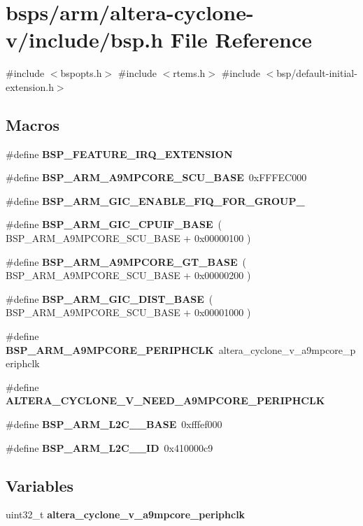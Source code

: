\hypertarget{bsps_2arm_2altera-cyclone-v_2include_2bsp_8h}{}\section{bsps/arm/altera-\/cyclone-\/v/include/bsp.h File Reference}
\label{bsps_2arm_2altera-cyclone-v_2include_2bsp_8h}
{\ttfamily \#include $<$bspopts.\+h$>$}\newline
{\ttfamily \#include $<$rtems.\+h$>$}\newline
{\ttfamily \#include $<$bsp/default-\/initial-\/extension.\+h$>$}\newline
\subsection*{Macros}
\begin{DoxyCompactItemize}
\item 
\#define {\bfseries B\+S\+P\+\_\+\+F\+E\+A\+T\+U\+R\+E\+\_\+\+I\+R\+Q\+\_\+\+E\+X\+T\+E\+N\+S\+I\+ON}
\item 
\#define {\bfseries B\+S\+P\+\_\+\+A\+R\+M\+\_\+\+A9\+M\+P\+C\+O\+R\+E\+\_\+\+S\+C\+U\+\_\+\+B\+A\+SE}~0x\+F\+F\+F\+E\+C000
\item 
\#define {\bfseries B\+S\+P\+\_\+\+A\+R\+M\+\_\+\+G\+I\+C\+\_\+\+E\+N\+A\+B\+L\+E\+\_\+\+F\+I\+Q\+\_\+\+F\+O\+R\+\_\+\+G\+R\+O\+U\+P\+\_}
\item 
\#define {\bfseries B\+S\+P\+\_\+\+A\+R\+M\+\_\+\+G\+I\+C\+\_\+\+C\+P\+U\+I\+F\+\_\+\+B\+A\+SE}~( B\+S\+P\+\_\+\+A\+R\+M\+\_\+\+A9\+M\+P\+C\+O\+R\+E\+\_\+\+S\+C\+U\+\_\+\+B\+A\+SE + 0x00000100 )
\item 
\#define {\bfseries B\+S\+P\+\_\+\+A\+R\+M\+\_\+\+A9\+M\+P\+C\+O\+R\+E\+\_\+\+G\+T\+\_\+\+B\+A\+SE}~( B\+S\+P\+\_\+\+A\+R\+M\+\_\+\+A9\+M\+P\+C\+O\+R\+E\+\_\+\+S\+C\+U\+\_\+\+B\+A\+SE + 0x00000200 )
\item 
\#define {\bfseries B\+S\+P\+\_\+\+A\+R\+M\+\_\+\+G\+I\+C\+\_\+\+D\+I\+S\+T\+\_\+\+B\+A\+SE}~( B\+S\+P\+\_\+\+A\+R\+M\+\_\+\+A9\+M\+P\+C\+O\+R\+E\+\_\+\+S\+C\+U\+\_\+\+B\+A\+SE + 0x00001000 )
\item 
\#define {\bfseries B\+S\+P\+\_\+\+A\+R\+M\+\_\+\+A9\+M\+P\+C\+O\+R\+E\+\_\+\+P\+E\+R\+I\+P\+H\+C\+LK}~altera\+\_\+cyclone\+\_\+v\+\_\+a9mpcore\+\_\+periphclk
\item 
\#define {\bfseries A\+L\+T\+E\+R\+A\+\_\+\+C\+Y\+C\+L\+O\+N\+E\+\_\+\+V\+\_\+\+N\+E\+E\+D\+\_\+\+A9\+M\+P\+C\+O\+R\+E\+\_\+\+P\+E\+R\+I\+P\+H\+C\+LK}
\item 
\#define {\bfseries B\+S\+P\+\_\+\+A\+R\+M\+\_\+\+L2\+C\+\_\+\_\+\+B\+A\+SE}~0xfffef000
\item 
\#define {\bfseries B\+S\+P\+\_\+\+A\+R\+M\+\_\+\+L2\+C\+\_\+\_\+\+ID}~0x410000c9
\end{DoxyCompactItemize}
\subsection*{Variables}
\begin{DoxyCompactItemize}
\item 
uint32\+\_\+t {\bfseries altera\+\_\+cyclone\+\_\+v\+\_\+a9mpcore\+\_\+periphclk}
\end{DoxyCompactItemize}
